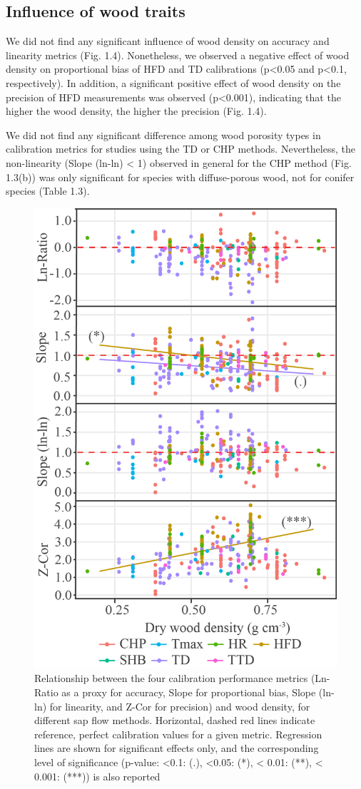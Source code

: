 \documentclass[11pt,twoside]{reedthesis}
\begin{document}
\subsection{Influence of wood traits}\label{influence-of-wood-traits}

We did not find any significant influence of wood density on accuracy
and linearity metrics (Fig. 1.4). Nonetheless, we observed a negative
effect of wood density on proportional bias of HFD and TD calibrations
(p\textless{}0.05 and p\textless{}0.1, respectively). In addition, a
significant positive effect of wood density on the precision of HFD
measurements was observed (p\textless{}0.001), indicating that the
higher the wood density, the higher the precision (Fig. 1.4).\par

We did not find any significant difference among wood porosity types in
calibration metrics for studies using the TD or CHP methods.
Nevertheless, the non-linearity (Slope (ln-ln) \textless{} 1) observed
in general for the CHP method (Fig. 1.3(b)) was only significant for
species with diffuse-porous wood, not for conifer species (Table
1.3).\par
\begin{figure}[hbt!]

{\centering \includegraphics[width=0.55\linewidth]{figure/CH2/DENSITY} 

}

\caption{Relationship between the four calibration performance metrics (Ln-Ratio as a proxy for accuracy, Slope for proportional bias, Slope (ln-ln) for linearity, and Z-Cor for precision) and wood density, for different sap flow methods. Horizontal, dashed red lines indicate reference, perfect calibration values for a given metric. Regression lines are shown for significant effects only, and the corresponding level of significance (p-value: <0.1: (.), <0.05: (*), < 0.01: (**), < 0.001: (***)) is also reported }\label{fig:ch1fig4}
\end{figure}
\end{document}
